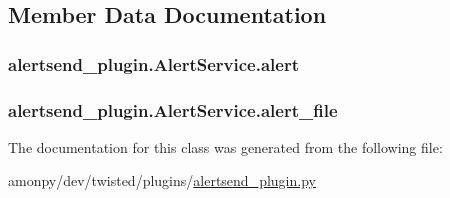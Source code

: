 \subsection{Member Data Documentation}
\hypertarget{classalertsend__plugin_1_1_alert_service_a91b88386bc56aabc6e5e0477eb4f5946}{
\subsubsection[{alert}]{\setlength{\rightskip}{0pt plus 5cm}alertsend\-\_\-plugin.\-Alert\-Service.\-alert}}\label{classalertsend__plugin_1_1_alert_service_a91b88386bc56aabc6e5e0477eb4f5946}
\hypertarget{classalertsend__plugin_1_1_alert_service_acc72890f5638b996635878a4b21f7f2b}{
\subsubsection[{alert\-\_\-file}]{\setlength{\rightskip}{0pt plus 5cm}alertsend\-\_\-plugin.\-Alert\-Service.\-alert\-\_\-file}}\label{classalertsend__plugin_1_1_alert_service_acc72890f5638b996635878a4b21f7f2b}


The documentation for this class was generated from the following file\-:\begin{DoxyCompactItemize}
\item 
amonpy/dev/twisted/plugins/\hyperlink{alertsend__plugin_8py}{alertsend\-\_\-plugin.\-py}\end{DoxyCompactItemize}
